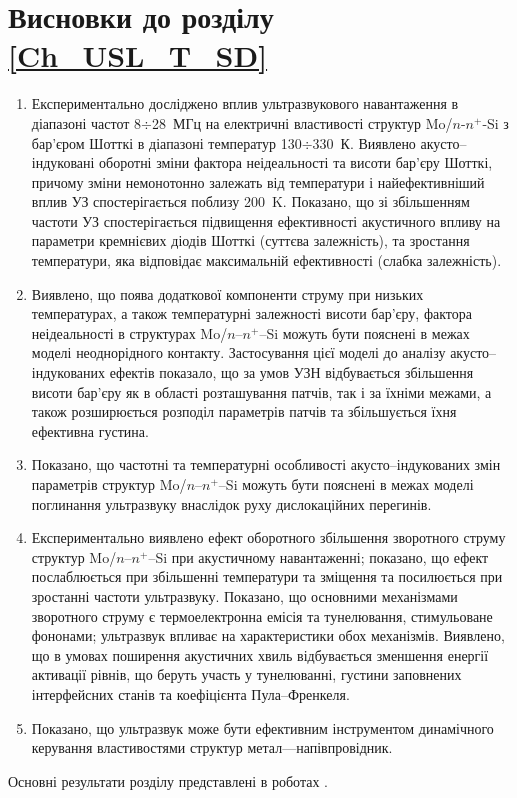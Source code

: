 \section*{Висновки до розділу \ref{Ch_USL_T_SD}}
  \begin{enumerate}[leftmargin=0cm,itemindent=3em]
     \item Експериментально досліджено вплив ультразвукового навантаження в діапазоні частот 8$\div$28~МГц на електричні властивості структур Mo/$n$-$n^{+}$-Si з бар'єром Шотткі в діапазоні температур 130$\div$330~К.
 Виявлено акусто--індуковані оборотні зміни фактора неідеальності та висоти бар'єру Шотткі, причому зміни немонотонно залежать від температури і найефективніший вплив УЗ спостерігається поблизу 200~K.
  Показано, що зі збільшенням частоти УЗ  спостерігається підвищення ефективності акустичного впливу на параметри кремнієвих діодів Шотткі (суттєва залежність),
та зростання температури, яка відповідає максимальній ефективності (слабка залежність).



\item Виявлено, що поява додаткової компоненти струму при низьких температурах, а також температурні залежності висоти бар'єру, фактора неідеальності в структурах Mo/$n$--$n^{+}$--Si можуть бути пояснені в межах моделі неоднорідного контакту.
    Застосування цієї моделі до аналізу акусто--індукованих ефектів показало, що
 за умов УЗН відбувається збільшення висоти бар'єру як в області розташування патчів, так і за їхніми межами, а також розширюється розподіл параметрів патчів та збільшується їхня ефективна густина.


\item Показано, що частотні та температурні особливості акусто--індукованих змін параметрів структур Mo/$n$--$n^{+}$--Si можуть бути пояснені в межах
 моделі поглинання ультразвуку внаслідок руху дислокаційних перегинів.



\item Експериментально виявлено ефект оборотного збільшення зворотного струму структур Mo/$n$--$n^{+}$--Si при акустичному навантаженні;
показано, що ефект послаблюється при збільшенні температури та зміщення та посилюється при зростанні частоти ультразвуку.
Показано, що основними механізмами зворотного струму є термоелектронна емісія та тунелювання, стимульоване фононами;
ультразвук впливає на характеристики обох механізмів.
 Виявлено, що в умовах поширення акустичних хвиль відбувається зменшення енергії активації рівнів, що беруть участь у тунелюванні,
густини заповнених інтерфейсних станів та коефіцієнта Пула--Френкеля.

\item Показано, що ультразвук може бути ефективним інструментом динамічного керування властивостями структур метал---напівпровідник.

  \end{enumerate}	

Основні результати розділу представлені в роботах \cite{Olikh:UPJ2014,OlikhJAP,Olikh:Ultras2016,Olikh2016JSem,
8Drog,2014IUSOl,2015ICU,7UNCPS}.
